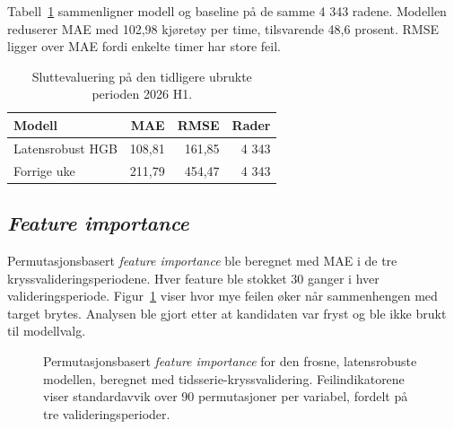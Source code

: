 Tabell~\ref{tab:final-results} sammenligner modell og baseline på de samme 4 343
radene. Modellen reduserer MAE med 102,98 kjøretøy per time, tilsvarende 48,6
prosent. RMSE ligger over MAE fordi enkelte timer har store feil.

\begin{table}[htbp]
  \centering
  \caption{Sluttevaluering på den tidligere ubrukte perioden 2026 H1.}
  \label{tab:final-results}
  \begin{tabularx}{\textwidth}{Xrrr}
    \toprule
    Modell & MAE & RMSE & Rader \\
    \midrule
    Latensrobust HGB & 108,81 & 161,85 & 4 343 \\
    Forrige uke & 211,79 & 454,47 & 4 343 \\
    \bottomrule
  \end{tabularx}
\end{table}

\subsection{\emph{Feature importance}}

Permutasjonsbasert \emph{feature importance} ble beregnet med MAE i de tre
kryssvalideringsperiodene. Hver feature ble stokket 30 ganger i hver
valideringsperiode. Figur~\ref{fig:feature-importance} viser hvor mye feilen øker når
sammenhengen med target brytes. Analysen ble gjort etter at kandidaten var fryst og
ble ikke brukt til modellvalg.

\begin{figure}[htbp]
  \centering
  \caption{Permutasjonsbasert \emph{feature importance} for den frosne,
  latensrobuste modellen, beregnet med tidsserie-kryssvalidering. Feilindikatorene
  viser standardavvik over 90 permutasjoner per variabel, fordelt på tre
  valideringsperioder.}
  \label{fig:feature-importance}
\end{figure}

